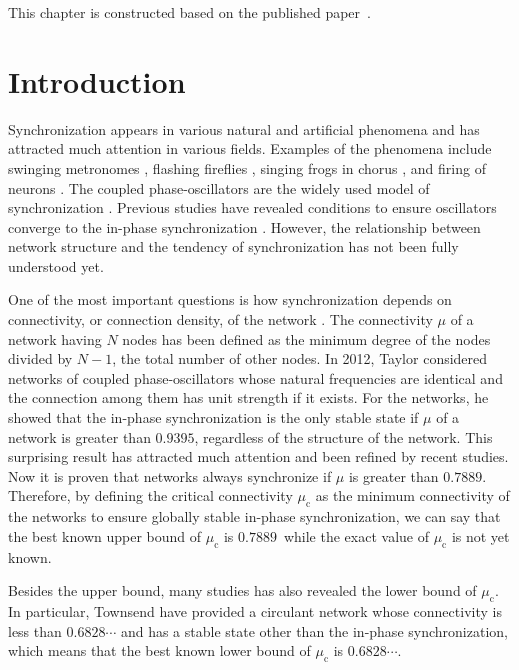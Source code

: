 This chapter is constructed based on the published paper~\cite{yoneda2021}.

\section{Introduction}
Synchronization appears in various natural and artificial phenomena and has attracted much attention in various fields. Examples of the phenomena include swinging metronomes \cite{pantaleone2002}, flashing fireflies \cite{smith1935, buck1968}, singing frogs in chorus \cite{aihara2014}, and firing of neurons \cite{cossart2003, winfree1967, Lu2016}. The coupled phase-oscillators are the widely used model of synchronization \cite{kuramoto1975}. Previous studies have revealed conditions to ensure oscillators converge to the in-phase synchronization \cite{strogatz2000, ott2008, chiba2013, daFonseca2018, dorogovtsev2008}. However, the relationship between network structure and the tendency of synchronization has not been fully understood yet.

One of the most important questions is how synchronization depends on connectivity, or connection density, of the network \cite{watanabe1994, wiley2006, taylor2012, canale2015, ling2019, townsend2020, lu2020}. The connectivity $\mu$ of a network having $N$ nodes has been defined as the minimum degree of the nodes divided by $N-1$, the total number of other nodes. In 2012, Taylor considered networks of coupled phase-oscillators whose natural frequencies are identical and the connection among them has unit strength if it exists. For the networks, he showed that the in-phase synchronization is the only stable state if $\mu$ of a network is greater than $0.9395$\cite{taylor2012}, regardless of the structure of the network. This surprising result has attracted much attention and been refined by recent studies\cite{ling2019,lu2020}. Now it is proven that networks always synchronize if $\mu$ is greater than $0.7889$\cite{lu2020}. Therefore, by defining the critical connectivity $\mu_{\mathrm{c}}$ as the minimum connectivity of the networks to ensure globally stable in-phase synchronization, we can say that the best known upper bound of $\mu_{\mathrm{c}}$ is $0.7889$\, while the exact value of $\mu_{\mathrm{c}}$ is not yet known.

Besides the upper bound, many studies has also revealed the lower bound of $\mu_{\mathrm{c}}$\cite{wiley2006,canale2015,townsend2020}. In particular, Townsend \etal have provided a circulant network whose connectivity is less than $0.6828\cdots$ and has a stable state other than the in-phase synchronization\cite{townsend2020}, which means that the best known lower bound of $\mu_{\mathrm{c}}$ is $0.6828\cdots$.

